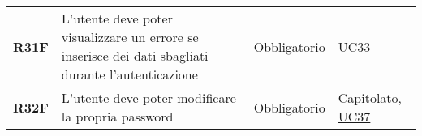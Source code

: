 \begin{center}
\begin{longtable}[!h]{p{50px} p{245px} p{75px} p{50px}}
        \textbf{R31F}                         & L'utente deve poter visualizzare un errore se inserisce dei dati sbagliati durante l'autenticazione & Obbligatorio             & \hyperref[sec:UC33]{UC33}                      \\
        \textbf{R32F}                         & L'utente deve poter modificare la propria password                                                  & Obbligatorio             & Capitolato, \hyperref[sec:UC37]{UC37}          \\
    \end{longtable}
\end{center}
\newpage
